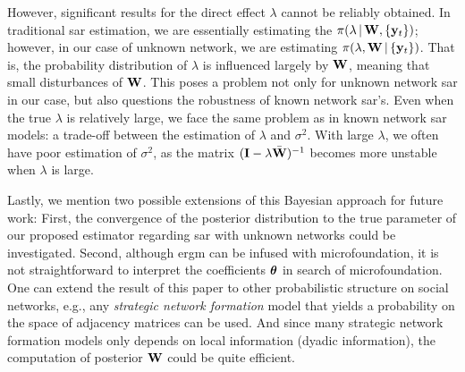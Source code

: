 \documentclass[a4paper]{article}
\begin{document}
However,
significant results for the direct effect $\lambda$ cannot be reliably obtained.
In traditional \gls{sar} estimation,
we are essentially estimating the $\pi(\lambda\,|\,\mathbf{W},\{\mathbf{y}_{t}\})$;
however, in our case of unknown network,
we are estimating $\pi(\lambda,\mathbf{W}\,|\,\{\mathbf{y}_{t}\})$.
That is, the probability distribution of $\lambda$ is influenced largely by $\mathbf{W}$,
meaning that small disturbances of $\mathbf{W}$.
This poses a problem not only for unknown network \gls{sar} in our case,
but also questions the robustness of known network \gls{sar}'s.
Even when the true $\lambda$ is relatively large,
we face the same problem as in known network \gls{sar} models:
a trade-off between the estimation of $\lambda$ and $\sigma^2$.
With large $\lambda$,
we often have poor estimation of $\sigma^2$,
as the matrix $(\mathbf{I}-\lambda\bar{\mathbf{W}})^{-1}$ becomes more unstable when $\lambda$ is large.

Lastly,
we mention two possible extensions of this Bayesian approach for future work:
First,
the convergence of the posterior distribution to the true parameter of our proposed estimator
regarding \gls{sar} with unknown networks could be investigated.
Second,
although \gls{ergm} can be infused with microfoundation,
it is not straightforward to interpret the coefficients $\boldsymbol{\theta}$ in search of microfoundation.
One can extend the result of this paper to other probabilistic structure on social networks,
e.g., any \emph{strategic network formation} model that yields a probability on the space of adjacency matrices can be used.
And since many strategic network formation models only depends on local information (dyadic information),
the computation of posterior $\mathbf{W}$ could be quite efficient.
\asDemonstrated
\clearpage


\end{document}
